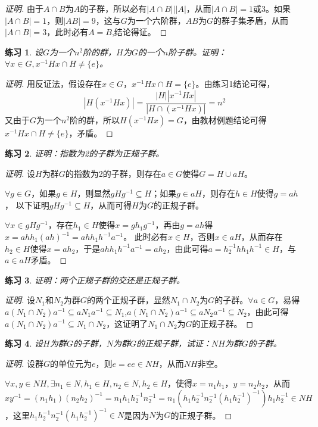 \documentclass{article}
\newtheorem{Exercise}{练习}
\begin{document}
\begin{CJK*}{UTF8}{gbsn}
\begin{proof}[证明]
  由于$A\cap B$为$A$的子群，所以必有$|A\cap B|||A|$，从而$|A\cap B|=1$或$3$。如果$|A\cap B|=1$，则$|AB|=9$，这与$G$为一个六阶群，$AB$为$G$的群子集矛盾，从而$|A\cap B|=3$，此时必有$A=B$,结论得证。
\end{proof}
\begin{Exercise}
设$G$为一个$n^2$阶的群，$H$为$G$的一个$n$阶子群。证明：$\forall x\in G, x^{-1}Hx\cap H \neq \{e\}$。
\end{Exercise}
\begin{proof}[证明]
  用反证法，假设存在$x\in G$，$x^{-1}Hx\cap H = \{e\}$。由练习1结论可得，
  \[|H(x^{-1}Hx)|=\frac{|H||x^{-1}Hx|}{|H\cap (x^{-1}Hx)|}=n^2\]
  又由于$G$为一个$n^2$阶的群，所以$H(x^{-1}Hx)=G$，由教材例题结论可得$x^{-1}Hx\cap H \neq \{e\}$，矛盾。
\end{proof}
\begin{Exercise}
证明：指数为2的子群为正规子群。
\end{Exercise}
\begin{proof}[证明]
  设$H$为群$G$的指数为2的子群，则存在$a\in G$使得$G=H\cup aH$。


  $\forall g\in G$，如果$g\in H$，则显然$gHg^{-1}\subseteq H$；如果$g\in aH$，则存在$h\in H$使得$g=ah$，
  以下证明$gHg^{-1}\subseteq H$，从而可得$H$为$G$的正规子群。

  $\forall x\in gHg^{-1}$，存在$h_1\in H$使得$x=gh_1g^{-1}$，再由$g=ah$得$x=ahh_1(ah)^{-1}=ahh_1h^{-1}a^{-1}$。
  此时必有$x\in H$，否则$x\in aH$，从而存在$h_2\in H$使得$x=ah_2$，于是$ahh_1h^{-1}a^{-1}=ah_2$，由此可得$a=h_2^{-1}hh_1h^{-1}\in H$，与$a\in aH$矛盾。
\end{proof}
\begin{Exercise}
证明：两个正规子群的交还是正规子群。
\end{Exercise}
\begin{proof}[证明]
  设$N_1$和$N_2$为群$G$的两个正规子群，显然$N_1\cap N_2$为$G$的子群。$\forall a\in G$，易得$a(N_1\cap N_2)a^{-1}\subseteq aN_1a^{-1}\subseteq N_1$,$a(N_1\cap N_2)a^{-1}\subseteq aN_2a^{-1}\subseteq N_2$，由此可得$a(N_1\cap N_2)a^{-1}\subseteq N_1\cap N_2$，这证明了$N_1\cap N_2$为$G$的正规子群。
\end{proof}
\begin{Exercise}
设$H$为群$G$的子群，$N$为群$G$的正规子群，试证：$NH$为群$G$的子群。
\end{Exercise}
\begin{proof}[证明]
  设群$G$的单位元为$e$，则$e=ee\in NH$，从而$NH$非空。

  $\forall x,y \in NH, \exists n_1\in N,h_1\in H,n_2\in N,h_2\in H$，使得$x=n_1h_1$，$y=n_2h_2$，从而
  $xy^{-1}=(n_1h_1)(n_2h_2)^{-1}=n_1h_1h_2^{-1}n_2^{-1}=n_1(h_1h_2^{-1}n_2^{-1}(h_1h_2^{-1})^{-1})h_1h_2^{-1}\in NH$，这里$h_1h_2^{-1}n_2^{-1}(h_1h_2^{-1})^{-1}\in N$是因为$N$为$G$的正规子群。
\end{proof}


\end{CJK*}
\end{document}
